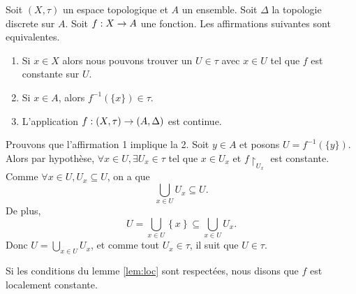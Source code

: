 \documentclass[french]{article}
\begin{document}
\begin{lemme}\label{lem:loc}
  Soit $(X, \tau)$ un espace topologique et $A$ un ensemble. Soit $\Delta$ la topologie discrete sur $A$. Soit $f: X \rightarrow A$ une fonction. Les affirmations suivantes sont equivalentes.
  \begin{enumerate}
    \item Si $x \in X$ alors nous pouvons trouver un $U \in \tau$ avec $x \in U$ tel que $f$ est constante sur $U$.
    \item Si $x \in A$, alors $f^{-1}(\{ x \}) \in \tau$.
    \item L'application $f: (X, \tau) \rightarrow (A, \Delta)$ est continue.
  \end{enumerate}

  \tcblower
  \begin{preuve}
  Prouvons que l'affirmation 1 implique la 2. Soit $y \in A$ et posons $U = f^{-1}\left( \{ y\} \right)$. Alors par hypothèse, $\forall x \in U, \exists U_x \in \tau$ tel que $x \in U_x$ et $f {\restriction_{U_x}}$ est constante. Comme $\forall x \in U, U_x \subseteq U$, on a que
  $$\bigcup_{x \in U} U_x \subseteq U.$$
  De plus,
  $$U = \bigcup_{x \in U} \left\{ x \right\} \subseteq \bigcup_{x \in U} U_x.$$ 
  Donc $U = \bigcup\limits_{x \in U} U_x$, et comme tout $U_x \in \tau$, il suit que $U \in \tau$.
  \end{preuve}
\end{lemme}

\begin{definition}
  Si les conditions du lemme \ref{lem:loc} sont respectées, nous disons que $f$ est localement constante.
\end{definition}
\end{document}
